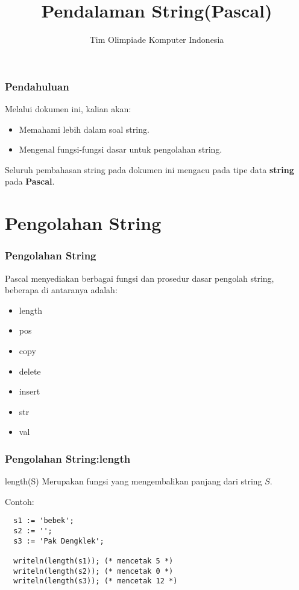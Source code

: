 \documentclass{beamer}
\title{Pendalaman String\newline (Pascal)}
\author{Tim Olimpiade Komputer Indonesia}
\date{}
\begin{document}
\begin{frame}
\titlepage
\end{frame}

\begin{frame}
\frametitle{Pendahuluan}
Melalui dokumen ini, kalian akan:
\begin{itemize}
  \item Memahami lebih dalam soal string.
  \item Mengenal fungsi-fungsi dasar untuk pengolahan string.
\end{itemize}
\vfill
Seluruh pembahasan string pada dokumen ini mengacu pada tipe data \textbf{string} pada \textbf{Pascal}.
\end{frame}

\section{Pengolahan String}
\frame{\sectionpage}

\begin{frame}
\frametitle{Pengolahan String}
Pascal menyediakan berbagai fungsi dan prosedur dasar pengolah string, beberapa di antaranya adalah:
\begin{itemize}
  \item length
  \item pos
  \item copy
  \item delete
  \item insert
  \item str
  \item val
\end{itemize}
\end{frame}

\begin{frame}[fragile]
\frametitle{Pengolahan String:\newline length}
\begin{block}{length(S)}
Merupakan fungsi yang mengembalikan panjang dari string $S$.
\end{block}

Contoh:
\begin{lstlisting}
  s1 := 'bebek';
  s2 := '';
  s3 := 'Pak Dengklek';

  writeln(length(s1)); (* mencetak 5 *)
  writeln(length(s2)); (* mencetak 0 *)
  writeln(length(s3)); (* mencetak 12 *)
\end{lstlisting}
\end{frame}
\end{document}
